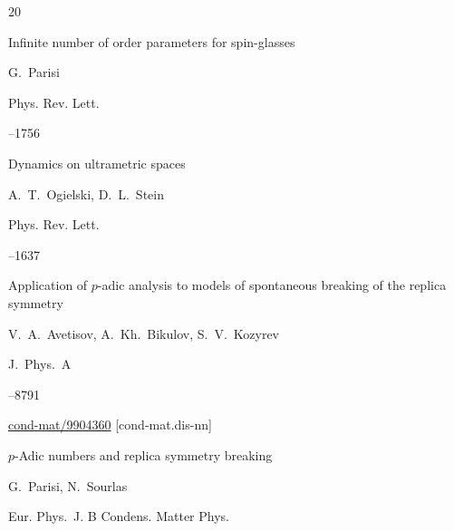{\begin{thebibliography}{20}

\paper Infinite number of order parameters for spin-glasses

\by G.~Parisi

\jour Phys. Rev. Lett.




--1756










\paper Dynamics on ultrametric spaces

\by A.~T.~Ogielski, D.~L.~Stein

\jour Phys. Rev. Lett.




--1637










\paper Application of $p$-adic analysis to models of spontaneous breaking of the replica symmetry

\by V.~A.~Avetisov, A.~Kh.~Bikulov, S.~V.~Kozyrev

\jour J.~Phys.~A




--8791


\arxiv \href{http://arxiv.org/abs/cond-mat/9904360}{cond-mat/9904360} [cond-mat.dis-nn]




\paper $p$-Adic numbers and replica symmetry breaking

\by G.~Parisi, N.~Sourlas

\jour Eur. Phys.~J. B Condens. Matter Phys.




\end{thebibliography}}
